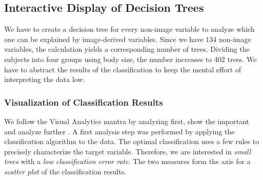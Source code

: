 \documentclass[a4paper,twoside]{style/article}
\begin{document}
\subsection{Interactive Display of Decision Trees}
We have to create a decision tree for every non-image variable to analyze which one can be explained by image-derived variables.
Since we have 134 non-image variables, the calculation yields a corresponding number of trees.
Dividing the subjects into four groups using body size, the number increases to 402 trees.
We have to abstract the results of the classification to keep the mental effort of interpreting the data low.
\subsubsection{Visualization of Classification Results}
\label{subsec:VisualizationOfClassificationResults}
We follow the Visual Analytics mantra by analyzing first, show the important and analyze further \cite{Keim}.
A first analysis step was performed by applying the classification algorithm to the data.
The optimal classification uses a few rules to precisely characterize the target variable.
Therefore, we are interested in \emph{small trees} with a \emph{low classification error rate}.
The two measures form the axis for a \emph{scatter plot} of the classification results.
\end{document}
